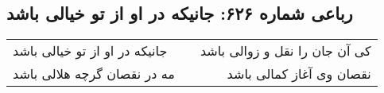 \begin{center}
\section*{رباعی شماره ۶۲۶: جانیکه در او از تو خیالی باشد}
\label{sec:0626}
\begin{longtable}{l p{0.5cm} r}
جانیکه در او از تو خیالی باشد
&&
کی آن جان را نقل و زوالی باشد
\\
مه در نقصان گرچه هلالی باشد
&&
نقصان وی آغاز کمالی باشد
\\
\end{longtable}
\end{center}
